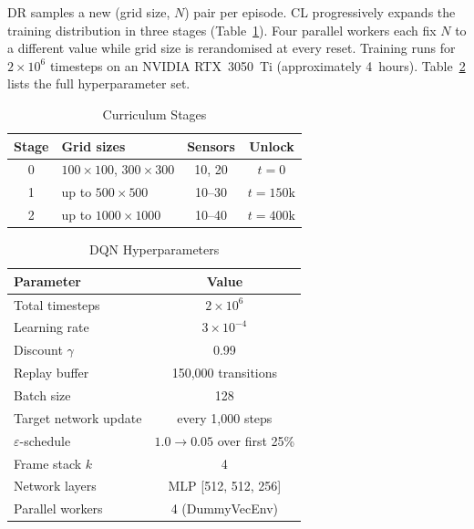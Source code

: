 \documentclass[conference]{IEEEtran}
\begin{document}
DR samples a new (grid size, $N$) pair per episode. CL progressively expands the training distribution in three stages (Table~\ref{tab:curriculum}). Four parallel workers each fix $N$ to a different value while grid size is rerandomised at every reset. Training runs for $2{\times}10^6$ timesteps on an NVIDIA RTX~3050~Ti (approximately 4~hours). Table~\ref{tab:hyper} lists the full hyperparameter set.

\begin{table}[htbp]
\caption{Curriculum Stages}
\begin{center}
\begin{tabular}{|c|l|c|c|}
\hline
\textbf{Stage} & \textbf{Grid sizes} & \textbf{Sensors} & \textbf{Unlock} \\
\hline
0 & $100{\times}100$, $300{\times}300$ & 10, 20 & $t{=}0$ \\
1 & up to $500{\times}500$ & 10--30 & $t{=}150\text{k}$ \\
2 & up to $1000{\times}1000$ & 10--40 & $t{=}400\text{k}$ \\
\hline
\end{tabular}
\label{tab:curriculum}
\end{center}
\end{table}

\begin{table}[htbp]
\caption{DQN Hyperparameters}
\begin{center}
\begin{tabular}{|l|c|}
\hline
\textbf{Parameter} & \textbf{Value} \\
\hline
Total timesteps & $2 \times 10^6$ \\
Learning rate & $3 \times 10^{-4}$ \\
Discount $\gamma$ & 0.99 \\
Replay buffer & 150{,}000 transitions \\
Batch size & 128 \\
Target network update & every 1{,}000 steps \\
$\varepsilon$-schedule & $1.0 \to 0.05$ over first 25\% \\
Frame stack $k$ & 4 \\
Network layers & MLP [512, 512, 256] \\
Parallel workers & 4 (DummyVecEnv) \\
\hline
\end{tabular}
\label{tab:hyper}
\end{center}
\end{table}
\end{document}
